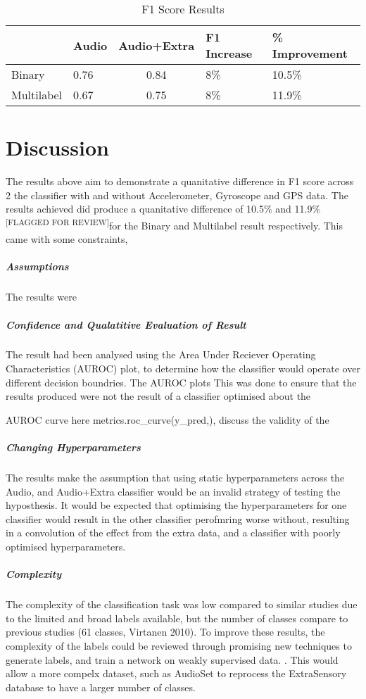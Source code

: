 \documentclass{UoNMCHA}
\newcommand{\flagforreview}{\textsuperscript{\color{red} [FLAGGED FOR REVIEW]}}
\numberwithin{equation}{section}
\begin{document}
\begin{table}[h]
    \begin{center}  
        \caption{F1 Score Results}\label{tab:F1Results}
    \begin{tabular}{llcll}
    \hline\hline 
    & Audio & \multicolumn{1}{l}{Audio+Extra} & F1 Increase & \% Improvement \\
    \hline 
    Binary     & 0.76  & 0.84                            & 8\%    & 10.5\%        \\
    Multilabel & 0.67  & 0.75                            & 8\%    & 11.9\%        \\   
    \hline                        
    \end{tabular}
    \end{center} 
\end{table}


\section{Discussion}\label{sec:Discussion}
The results above aim to demonstrate a quanitative difference in F1 score across 2 the classifier with and without Accelerometer, Gyroscope and GPS data. The results achieved did produce a quanitative difference of 10.5\% and 11.9\% \flagforreview for the Binary and Multilabel result respectively. This came with some constraints, 

\subparagraph{Assumptions}
The results were 
\subparagraph{Confidence and Qualatitive Evaluation of Result}
The result had been analysed using the Area Under Reciever Operating Characteristics (AUROC) plot, to determine how the classifier would operate over different decision boundries. The AUROC plots This was done to ensure that the results produced were not the result of a classifier optimised about the 

AUROC curve here metrics.roc\_curve(y\_pred,), discuss the validity of the 

\subparagraph{Changing Hyperparameters}
The results make the assumption that using static hyperparameters across the Audio, and Audio+Extra classifier would be an invalid strategy of testing the hyposthesis. It would be expected that optimising the hyperparameters for one classifier would result in the other classifier perofmring worse without, resulting in a convolution of the effect from the extra data, and a classifier with poorly optimised hyperparameters.

\subparagraph{Complexity} 
The complexity of the classification task was low compared to similar studies \cite{Tseng2017} \cite{Virtanen2010} due to the limited and broad labels available, but the number of classes compare to previous studies (61 classes, Virtanen 2010\cite{Virtanen2010}). To improve these results, the complexity of the labels could be reviewed through promising new techniques to generate labels, and train a network on weakly supervised data. \cite{Tseng2017}. This would allow a more compelx dataset, such as AudioSet \cite{Audiosetgoogle2018} to reprocess the ExtraSensory database to have a larger number of classes. 
\end{document}
